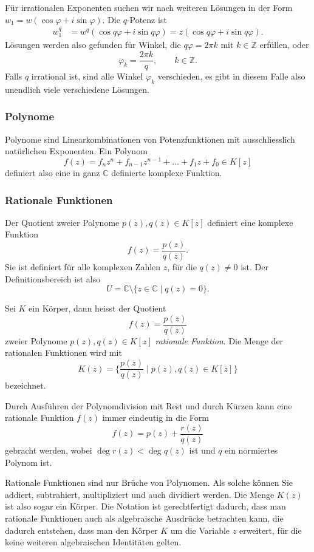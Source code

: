 Für irrationalen Exponenten suchen wir nach weiteren Lösungen in der
Form
\(
w_1 = w(\cos\varphi + i\sin\varphi)
\).
Die $q$-Potenz ist
\begin{align*}
w_1^q
&=
w^q(\cos q\varphi + i \sin q\varphi)
=
z(\cos q\varphi + i \sin q\varphi).
\end{align*}
Lösungen werden also gefunden für Winkel, die $q\varphi=2\pi k$ mit
$k\in\mathbb{Z}$ erfüllen, oder
\[
\varphi_k = \frac{2\pi k}{q},\qquad k\in\mathbb{Z}.
\]
Falls $q$ irrational ist, sind alle Winkel $\varphi_k$ verschieden,
es gibt in diesem Falle also unendlich viele verschiedene Lösungen.

%
%
\subsubsection{Polynome}
Polynome sind Linearkombinationen von Potenzfunktionen mit ausschliesslich
natürlichen Exponenten.
Ein Polynom
\[
f(z)
=
f_nz^n + f_{n-1}z^{n-1} + \dots + f_1z + f_0
\in
K[z]
\]
definiert also eine in ganz $\mathbb{C}$ definierte komplexe
Funktion.
%

%
%
\subsubsection{Rationale Funktionen}
Der Quotient zweier Polynome $p(z),q(z)\in K[z]$  definiert eine komplexe
Funktion
\[
f(z) = \frac{p(z)}{q(z)}.
\]
Sie ist definiert für alle komplexen Zahlen $z$, für die $q(z)\ne 0$ ist.
Der Definitionsbereich ist also
\[
U = \mathbb{C} \setminus \{ z\in\mathbb{C} \mid q(z)=0\}.
\]

\begin{definition}
Sei $K$ ein Körper, dann heisst der Quotient
\[
f(z) = \frac{p(z)}{q(z)}
\]
zweier Polynome $p(z),q(z)\in K[z]$ \emph{rationale Funktion}.
%
%
Die Menge der rationalen Funktionen wird mit
\[
K(z)
=
\biggl\{
\frac{p(z)}{q(z)}
\;\bigg|\;
p(z),q(z)\in K[z]
\biggr\}
\]
bezeichnet.
\end{definition}

Durch Ausführen der Polynomdivision mit Rest und durch Kürzen kann 
%
eine rationale Funktion $f(z)$ immer eindeutig in die Form
\[
f(z)
=
p(z)
+
\frac{r(z)}{q(z)}
\]
gebracht werden, wobei $\deg r(z)<\deg q(z)$ ist und $q$ ein normiertes
Polynom ist.

Rationale Funktionen sind nur Brüche von Polynomen.
Als solche können Sie addiert, subtrahiert, multipliziert und
auch dividiert werden.
Die Menge $K(z)$ ist also sogar ein Körper.
Die Notation ist gerechtfertigt dadurch, dass man rationale
Funktionen auch als algebraische Ausdrücke betrachten kann,
die dadurch entstehen, dass man den Körper $K$ um die Variable
$z$ erweitert, für die keine weiteren algebraischen Identitäten
gelten.

